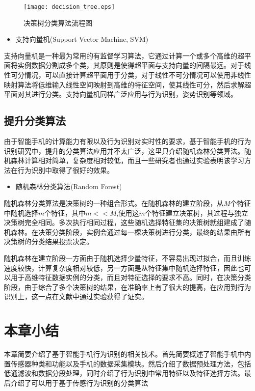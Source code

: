 \begin{figure}[ht]
\centering
\texttt{[image: decision\_tree.eps]}
\caption{决策树分类算法流程图}
\end{figure}
\begin{itemize}
	\item 支持向量机(Support Vector Machine, SVM)
\end{itemize}
\par 支持向量机是一种最为常用的有监督学习算法，它通过计算一个或多个高维的超平面将实例数据分割成多个类，其原则是使得超平面与支持向量的间隔最远。对于线性可分情况，可以直接计算超平面用于分类，对于线性不可分情况可以使用非线性映射算法将低维输入线性空间映射到高维的特征空间，使其线性可分，然后求解超平面对其进行分类。支持向量机同样广泛应用与行为识别，姿势识别等领域。

\subsection{提升分类算法}
\par 由于智能手机的计算能力有限以及行为识别对实时性的要求，基于智能手机的行为识别研究中，提升的分类算法应用并不太广泛，这里只介绍随机森林分类算法。随机森林计算相对简单，复杂度相对较低，而且一些研究者也通过实验表明该学习方法在行为识别中取得了很好的效果。
\begin{itemize}
	\item 随机森林分类算法(Random Forest)
\end{itemize}
\par 随机森林分类算法是决策树的一种组合形式。在随机森林的建立阶段，从$M$个特征中随机选择$m$个特征，其中$m<<M$,使用这$m$个特征建立决策树，其过程与独立决策树完全相同。多次执行相同过程，这些随机选择特征集的决策树就组建成了随机森林。在决策分类阶段，实例会通过每一棵决策树进行分类，最终的结果由所有决策树的分类结果投票决定。
\par 随机森林在建立阶段一方面由于随机选择少量特征，不容易出现过拟合，而且训练速度较快，计算复杂度相对较低，另一方面是从特征集中随机选择特征，因此也可以用于高维特征数据实例的分类，而且对特征选择的要求不高。同时，在决策分类阶段，由于综合了多个决策树的结果，在准确率上有了很大的提高，在应用到行为识别上，这一点在文献中通过实验获得了证实。

\section{本章小结}
\par 本章简要介绍了基于智能手机行为识别的相关技术。首先简要概述了智能手机中内置传感器种类和功能以及手机的数据采集模块。然后介绍了数据预处理方法，包括低通滤波和数据分段处理，同时介绍了行为识别中常用特征以及特征选择方法。最后介绍了可以用于基于传感行为识别的分类算法